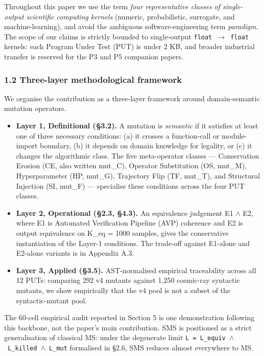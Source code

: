 \documentclass[review,12pt,authoryear]{elsarticle}
\providecommand{\tightlist}{\setlength{\itemsep}{0pt}\setlength{\parskip}{0pt}}
\begin{document}
Throughout this paper we use the term \emph{four representative classes
of single-output scientific computing kernels} (numeric, probabilistic,
surrogate, and machine-learning), and avoid the ambiguous
software-engineering term \emph{paradigm}. The scope of our claims is
strictly bounded to single-output \texttt{float\ $\to$\ float} kernels: each
Program Under Test (PUT) is under 2 KB, and broader industrial transfer
is reserved for the P3 and P5 companion papers.

\subsubsection{1.2 Three-layer methodological
framework}\label{three-layer-methodological-framework}

We organise the contribution as a three-layer framework around
domain-semantic mutation operators.

\begin{itemize}
\tightlist
\item
  \textbf{Layer 1, Definitional (§3.2).} A mutation is \emph{semantic}
  if it satisfies at least one of three necessary conditions: (a) it
  crosses a function-call or module-import boundary, (b) it depends on
  domain knowledge for legality, or (c) it changes the algorithmic
  class. The five meta-operator classes --- Conservation Erosion (CE,
  also written mut\_C), Operator Substitution (OS, mut\_M),
  Hyperparameter (HP, mut\_G), Trajectory Flip (TF, mut\_T), and
  Structural Injection (SI, mut\_F) --- specialise these conditions
  across the four PUT classes.
\item
  \textbf{Layer 2, Operational (§2.3, §4.3).} An equivalence judgement
  E1 $\wedge$ E2, where E1 is Automated Verification Pipeline (AVP) coherence
  and E2 is output equivalence on K\_eq = 1000 samples, gives the
  conservative instantiation of the Layer-1 conditions. The trade-off
  against E1-alone and E2-alone variants is in Appendix A.3.
\item
  \textbf{Layer 3, Applied (§3.5).} AST-normalised empirical
  traceability across all 12 PUTs: comparing 292 v4 mutants against
  1,250 cosmic-ray syntactic mutants, we show empirically that the v4
  pool is not a subset of the syntactic-mutant pool.
\end{itemize}

The 60-cell empirical audit reported in Section 5 is one demonstration
following this backbone, not the paper's main contribution. SMS is
positioned as a strict generalisation of classical MS: under the
degenerate limit \texttt{L\ =\ L\_equiv\ $\wedge$\ L\_killed\ $\wedge$\ L\_mut}
formalised in §2.6, SMS reduces almost everywhere to MS.
\end{document}
